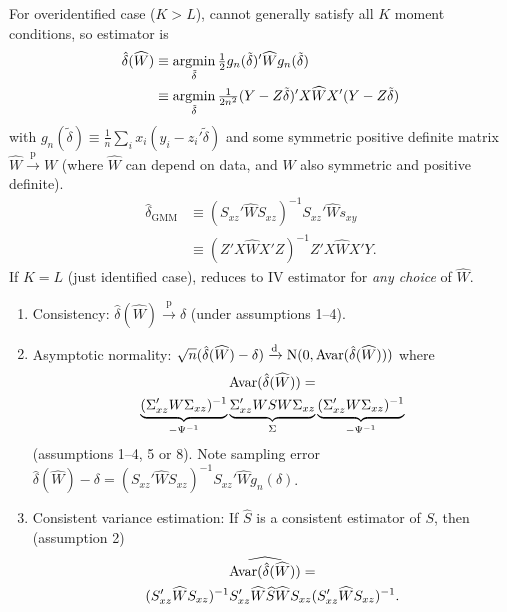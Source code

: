 \documentclass[8pt,letterpaper, landscape]{extarticle} %
\begin{document}
\begin{multicols}{3}
\begin{description}
 For overidentified case ($ K>L $), cannot generally satisfy all $ K $ moment conditions, so estimator is
\begin{align*}
\hat{\delta}(\widehat{W}) &\equiv \operatorname*{argmin}_{\tilde{\delta}} \tfrac{1}{2} g_n (\tilde{\delta})' \widehat{W} g_n (\tilde{\delta}) \\
&\equiv \operatorname*{argmin}_{\tilde{\delta}} \tfrac{1}{2 n^2} (Y - Z \tilde{\delta})' X \widehat{W} X' (Y - Z \tilde{\delta})
\end{align*}
with $ g_n (\tilde{\delta}) \equiv \tfrac{1}{n} \sum_i x_i (y_i - z_i' \tilde{\delta}) $ and some symmetric positive definite matrix $ \widehat{W} \xrightarrow{\text{p}} W $ (where $ \widehat{W} $ can depend on data, and $ W $ also symmetric and positive definite).
\begin{align*}
\hat{\delta}_{\text{GMM}} &\equiv (S_{xz}' \widehat{W} S_{xz})^{-1} S_{xz}' \widehat{W} s_{xy} \\
&\equiv (Z' X \widehat{W} X' Z)^{-1} Z' X \widehat{W} X' Y .
\end{align*}
If $ K = L $ (just identified case), reduces to IV estimator for \textit{any choice} of $ \widehat{W} $.
\begin{enumerate}
\item Consistency: $ \hat{\delta}(\widehat{W}) \xrightarrow{\text{p}} \delta $ (under assumptions 1--4).
\item Asymptotic normality: $ \sqrt{n} (\hat{\delta}(\widehat{W}) - \delta) \xrightarrow{\text{d}} \operatorname{N} (0, \operatorname{Avar} (\hat{\delta}(\widehat{W}))) $ where
\begin{multline*} \operatorname{Avar} (\hat{\delta}(\widehat{W})) = \\ \underbrace{(\Sigma_{xz}' W \Sigma_{xz})^{-1}}_{- \Psi^{-1}} \underbrace{\Sigma_{xz}' W S W \Sigma_{xz}}_{\Sigma} \underbrace{(\Sigma_{xz}' W \Sigma_{xz})^{-1}}_{- \Psi^{-1}} \end{multline*}
(assumptions 1--4, 5 or 8). Note sampling error $ \hat{\delta}(\widehat{W}) - \delta = (S_{xz}' \widehat{W} S_{xz})^{-1} S_{xz}' \widehat{W} g_{n}(\delta) $.
\item Consistent variance estimation: If $ \widehat{S} $ is a consistent estimator of $ S $, then (assumption 2)
\begin{multline*} \widehat{\operatorname{Avar} (\hat{\delta}(\widehat{W}))} = \\ (S_{xz}' \widehat{W} S_{xz})^{-1} S_{xz}' \widehat{W} \widehat{S} \widehat{W} S_{xz} (S_{xz}' \widehat{W} S_{xz})^{-1}. \end{multline*}

\end{enumerate}
\end{description}
\end{multicols}
\end{document}
